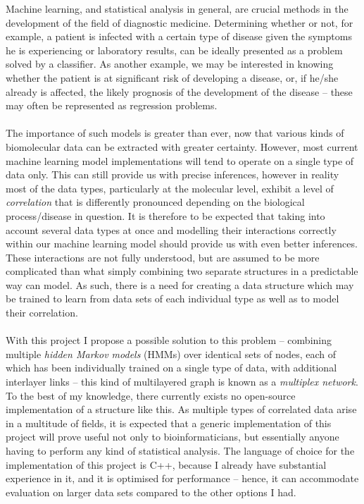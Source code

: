 Machine learning, and statistical analysis in general, are crucial methods in the development of the field of diagnostic medicine. Determining whether or not, for example, a patient is infected with a certain type of disease given the symptoms he is experiencing or laboratory results, can be ideally presented as a problem solved by a classifier. As another example, we may be interested in knowing whether the patient is at significant risk of developing a disease, or, if he/she already is affected, the likely prognosis of the development of the disease -- these may often be represented as regression problems. \\ \\
The importance of such models is greater than ever, now that various kinds of biomolecular data can be extracted with greater certainty. However, most current machine learning model implementations will tend to operate on a single type of data only. This can still provide us with precise inferences, however in reality most of the data types, particularly at the molecular level, exhibit a level of \emph{correlation} that is differently pronounced depending on the biological process/disease in question. It is therefore to be expected that taking into account several data types at once and modelling their interactions correctly within our machine learning model should provide us with even better inferences. These interactions are not fully understood, but are assumed to be more complicated than what simply combining two separate structures in a predictable way can model. As such, there is a need for creating a data structure which may be trained to learn from data sets of each individual type as well as to model their correlation. \\ \\
With this project I propose a possible solution to this problem -- combining multiple \emph{hidden Markov models} (HMMs) over identical sets of nodes, each of which has been individually trained on a single type of data, with additional interlayer links -- this kind of multilayered graph is known as a \emph{multiplex network}. To the best of my knowledge, there currently exists no open-source implementation of a structure like this. As multiple types of correlated data arise in a multitude of fields, it is expected that a generic implementation of this project will prove useful not only to bioinformaticians, but essentially anyone having to perform any kind of statistical analysis. The language of choice for the implementation of this project is C++, because I already have substantial experience in it, and it is optimised for performance -- hence, it can accommodate evaluation on larger data sets compared to the other options I had.

